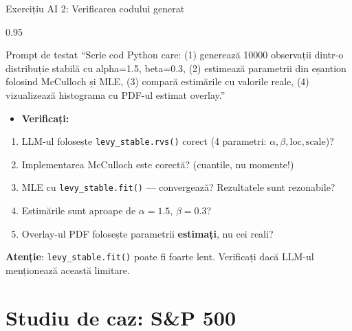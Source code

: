 \documentclass[9pt, aspectratio=169, t]{beamer}
\begin{document}
\begin{frame}{Exercițiu AI 2: Verificarea codului generat}
\begin{cminipage}{0.95\textwidth}
    \vspace{-3mm}
    \begin{block}{\footnotesize Prompt de testat}
        {\footnotesize
        ``Scrie cod Python care: (1) generează 10000 observații dintr-o distribuție stabilă cu alpha=1.5, beta=0.3, (2) estimează parametrii din eșantion folosind McCulloch și MLE, (3) compară estimările cu valorile reale, (4) vizualizează histograma cu PDF-ul estimat overlay.''
        }
    \end{block}
    \vspace{-2mm}
    {\footnotesize
    \begin{itemize}\setlength{\itemsep}{0pt}
        \item \textbf{Verificați:}
    \end{itemize}
    \begin{enumerate}\setlength{\itemsep}{0pt}
        \item LLM-ul folosește \texttt{levy\_stable.rvs()} corect (4 parametri: $\alpha, \beta, \text{loc}, \text{scale}$)?
        \item Implementarea McCulloch este corectă? (cuantile, nu momente!)
        \item MLE cu \texttt{levy\_stable.fit()} --- convergează? Rezultatele sunt rezonabile?
        \item Estimările sunt aproape de $\alpha = 1.5$, $\beta = 0.3$?
        \item Overlay-ul PDF folosește parametrii \textbf{estimați}, nu cei reali?
    \end{enumerate}
    }
    \vspace{-2mm}
    \begin{alertblock}{}
        {\footnotesize \textbf{Atenție}: \texttt{levy\_stable.fit()} poate fi foarte lent. Verificați dacă LLM-ul menționează această limitare.}
    \end{alertblock}
\end{cminipage}
\end{frame}

\section{Studiu de caz: S\&P 500}
\end{document}
